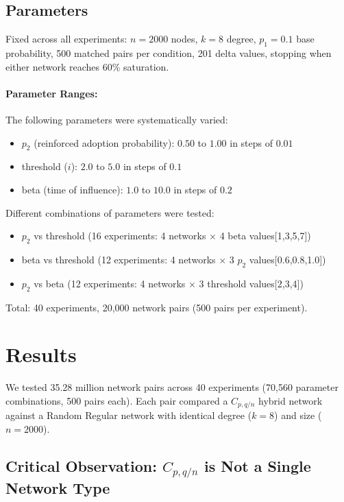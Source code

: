\documentclass[12pt,a4paper]{article}
\begin{document}
\subsection{Parameters}

Fixed across all experiments: $n=2000$ nodes, $k=8$ degree, $p_1=0.1$ base probability, 500 matched pairs per condition, 201 delta values, stopping when either network reaches 60\% saturation.

\paragraph{Parameter Ranges:}
The following parameters were systematically varied:
\begin{itemize}
    \item $p_2$ (reinforced adoption probability): $0.50$ to $1.00$ in steps of $0.01$
    \item threshold ($i$): $2.0$ to $5.0$ in steps of $0.1$
    \item beta (time of influence): $1.0$ to $10.0$ in steps of $0.2$
\end{itemize}

Different combinations of parameters were tested:
\begin{itemize}
    \item $p_2$ vs threshold (16 experiments: 4 networks $\times$ 4 beta values[1,3,5,7])
    \item beta vs threshold (12 experiments: 4 networks $\times$ 3 $p_2$ values[0.6,0.8,1.0])
    \item $p_2$ vs beta (12 experiments: 4 networks $\times$ 3 threshold values[2,3,4])
\end{itemize}

Total: 40 experiments, 20,000 network pairs (500 pairs per experiment).

\section{Results}

We tested 35.28 million network pairs across 40 experiments (70,560 parameter combinations, 500 pairs each). Each pair compared a $C_{p,q/n}$ hybrid network against a Random Regular network with identical degree ($k=8$) and size ($n=2000$).

\subsection{Critical Observation: \texorpdfstring{$C_{p,q/n}$}{C(p,q/n)} is Not a Single Network Type}
\end{document}
